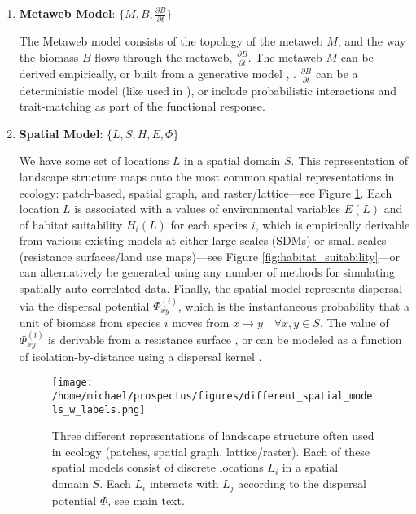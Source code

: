 \documentclass[]{article}
\begin{document}
\begin{enumerate}
\def\labelenumi{\arabic{enumi}.}
\item
  \textbf{Metaweb Model}: \(\{M, B, \frac{\partial B}{\partial t}\}\)

  The Metaweb model consists of the topology of the metaweb \(M\), and
  the way the biomass \(B\) flows through the metaweb,
  \(\frac{\partial B}{\partial t}\). The metaweb \(M\) can be derived
  empirically, or built from a generative model
  \citep{williams_simple_2000}, \citep{allesina_general_2008}.
  \(\frac{\partial B}{\partial t}\) can be a deterministic model (like
  used in \citep{thompson_process-based_2020, dominguez-garcia_unveiling_2019, delmas_simulations_2017, delmas_food_2020}), or include probabilistic interactions \cite{poisot_structure_2016} and trait-matching as part of the functional response.
\item
  \textbf{Spatial Model}: \(\{L, S, H, E, \Phi \}\)

  We have some set of locations \(L\) in a spatial domain \(S\). This
  representation of landscape structure maps onto the most common
  spatial representations in ecology: patch-based, spatial graph, and
  raster/lattice---see Figure \ref{fig:spatial_representations}. Each location \(L\) is associated with
  a values of environmental variables \(E(L)\) and of habitat
  suitability \(H_i(L)\) for each species \(i\), which is empirically
  derivable from various existing models at either large scales (SDMs)
  or small scales (resistance surfaces/land use maps)---see Figure \ref{fig:habitat_suitability}---or can alternatively be generated using any number of methods for simulating spatially auto-correlated
  data. Finally, the spatial model represents dispersal via the dispersal
  potential \(\Phi^{(i)}_{xy}\), which is the instantaneous
  probability that a unit of biomass from species \(i\) moves from
  \(x \to y \quad \forall x,y \in S\). The value of \(\Phi^{(i)}_{xy}\)
  is derivable from a resistance surface
  \citep{spear_use_2010}, or can be modeled as a function of
  isolation-by-distance using a dispersal kernel \citep{hanski_practical_1994}.

  \begin{figure}[H]
  \centering
  \texttt{[image: /home/michael/prospectus/figures/different\_spatial\_models\_w\_labels.png]}
  \caption{Three different representations of landscape structure often used in ecology (patches, spatial graph, lattice/raster). Each of these spatial models consist of discrete locations $L_i$ in a spatial domain $S$. Each $L_i$ interacts with $L_j$ according to the dispersal potential $\Phi$, see main text.}
  \label{fig:spatial_representations}
  \end{figure}


\end{enumerate}
\end{document}
